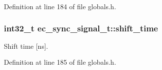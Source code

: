 Definition at line 184 of file globals.\-h.

\subsubsection[{shift\-\_\-time}]{\setlength{\rightskip}{0pt plus 5cm}int32\-\_\-t ec\-\_\-sync\-\_\-signal\-\_\-t\-::shift\-\_\-time}\label{structec__sync__signal__t_a75c1a27b0421473e05bf737fd0d38368}


Shift time [ns]. 



Definition at line 185 of file globals.\-h.

